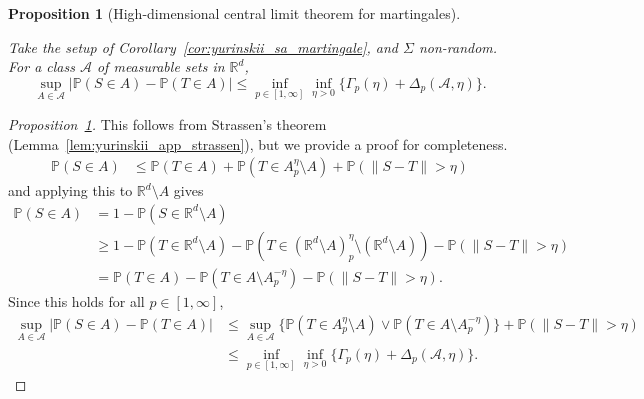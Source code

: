 \documentclass[11pt,lof]{puthesis}
\renewcommand{\P}{\ensuremath{\mathbb{P}}}
\newcommand{\R}{\ensuremath{\mathbb{R}}}
\newcommand{\cA}{\ensuremath{\mathcal{A}}}
\theoremstyle{break}
\newtheorem{proposition}{Proposition}[section]
\theoremstyle{proof}
\newtheorem{proof}{Proof}
\begin{document}
\begin{proposition}[High-dimensional central limit theorem for martingales]%
  \label{pro:yurinskii_app_clt}

  Take the setup of Corollary~\ref{cor:yurinskii_sa_martingale},
  and $\Sigma$ non-random.
  For a class $\cA$ of measurable sets in $\R^d$,
  \begin{equation}%
    \label{eq:yurinskii_app_high_dim_clt}
    \sup_{A\in \cA}
    \big|\P(S\in A) -\P(T\in A)\big|
    \leq \inf_{p \in [1, \infty]} \inf_{\eta>0}
    \big\{\Gamma_p(\eta) + \Delta_p(\cA, \eta) \big\}.
  \end{equation}
\end{proposition}

\begin{proof}[Proposition~\ref{pro:yurinskii_app_clt}]

  This follows from Strassen's theorem
  (Lemma~\ref{lem:yurinskii_app_strassen}), but we
  provide a proof for completeness.
  \begin{align*}
    \P(S \in A)
    &\leq
    \P(T \in A)
    + \P(T \in A_p^\eta \setminus A)
    + \P(\|S - T\| > \eta)
  \end{align*}
  and applying this to $\R^d \setminus A$ gives
  \begin{align*}
    \P(S\in A)
    &=
    1 - \P(S\in \R^d \setminus A) \\
    &\geq
    1 - \P(T \in \R^d \setminus A)
    - \P(T \in (\R^d \setminus A)_p^\eta \setminus (\R^d \setminus A))
    - \P(\|S - T\| > \eta) \\
    &=
    \P(T \in A)
    - \P(T \in A \setminus A_p^{-\eta})
    - \P(\|S - T\| > \eta).
  \end{align*}
  Since this holds for all $p \in [1, \infty]$,
  \begin{align*}
    \sup_{A\in \cA}
    \big|\P(S\in A) -\P(T\in A)\big|
    &\leq
    \sup_{A \in \cA}
    \big\{\P(T \in A_p^\eta\setminus A)
    \vee \P(T \in A \setminus A_p^{-\eta})\big\}
    + \P(\|S - T\| > \eta) \\
    &\leq
    \inf_{p \in [1, \infty]} \inf_{\eta>0}
    \big\{\Gamma_p(\eta) + \Delta_p(\cA, \eta) \big\}.
  \end{align*}
\end{proof}
\end{document}
